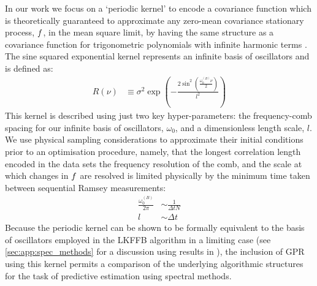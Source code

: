 In our work we focus on a `periodic kernel' to encode a covariance function which is theoretically guaranteed to approximate any zero-mean covariance stationary process, $f$, in the mean square limit, by having the same structure as a covariance function for trigonometric polynomials with infinite harmonic terms \cite{solin2014explicit, karlin1975first}. The sine squared exponential kernel represents an infinite basis of oscillators and is defined as:
\begin{align}
	R(\nu) &\equiv \sigma^2 \exp (- \frac{2\sin^2(\frac{\omega_0^{(B)}\nu}{2})}{l^2}) 
\end{align} 
This kernel is described using just two key hyper-parameters: the frequency-comb spacing for our infinite basis of oscillators, $\omega_0$, and a dimensionless length scale, $l$. We use physical sampling considerations to approximate their initial conditions prior to an optimisation procedure, namely, that the longest correlation length encoded in the data sets the frequency resolution of the comb, and the scale at which changes in $f$ are resolved is limited physically by the minimum time taken between sequential Ramsey measurements:
\begin{align}
	\frac{\omega_0^{(B)}}{2\pi} & \sim  \frac{1}{\Delta t N} \\
	l & \sim \Delta t
\end{align} 
Because the periodic kernel can be shown to be formally equivalent to the basis of oscillators employed in the LKFFB algorithm in a limiting case (see \cref{sec:app:spec_methods} for a discussion using results in \cite{solin2014explicit}), the inclusion of GPR using this kernel permits a comparison of the underlying algorithmic structures for the task of predictive estimation using spectral methods.

